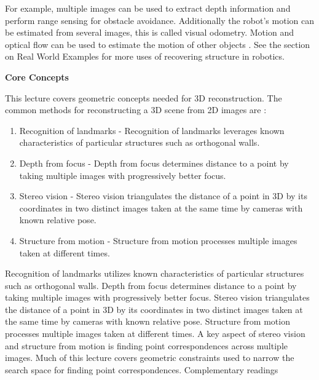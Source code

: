 \documentclass[twoside]{article}
\begin{document}
	For example, multiple images can be used to extract depth information and perform range sensing for obstacle avoidance.  Additionally the robot's motion can be estimated from several images, this is called visual odometry.  Motion and optical flow can be used to estimate the motion of other objects \cite{SNS} .  See the section on Real World Examples for more uses of recovering structure in robotics.
	
	\textbf{Core Concepts}
	
	This lecture \cite{slides} covers geometric concepts needed for 3D reconstruction.  The common methods for reconstructing a 3D scene from 2D images are :
\begin{enumerate}
\item Recognition of landmarks - Recognition of landmarks leverages known characteristics of particular structures such as orthogonal walls.
\item Depth from focus - Depth from focus determines distance to a point by taking multiple images with progressively better focus.
\item Stereo vision - Stereo vision triangulates the distance of a point in 3D by its coordinates in two distinct images taken at the same time by cameras with known relative pose.
\item Structure from motion - Structure from motion processes multiple images taken at different times.
\end{enumerate}

	Recognition of landmarks utilizes known characteristics of particular structures such as orthogonal walls. Depth from focus determines distance to a point by taking multiple images with progressively better focus. Stereo vision triangulates the distance of a point in 3D by its coordinates in two distinct images taken at the same time by cameras with known relative pose. Structure from motion processes multiple images taken at different times. A key aspect of stereo vision and structure from motion is finding point correspondences across multiple images. Much of this lecture covers geometric constraints used to narrow the search space for finding point correspondences. Complementary readings \cite{SNS, FP}
\end{document}
